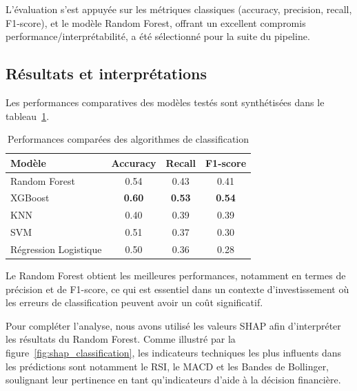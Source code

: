 \documentclass[a4paper,12pt]{article}
\begin{document}
L'évaluation s'est appuyée sur les métriques classiques (accuracy, precision, recall, F1-score), et le modèle Random Forest, offrant un excellent compromis performance/interprétabilité, a été sélectionné pour la suite du pipeline.

\subsection*{Résultats et interprétations}

Les performances comparatives des modèles testés sont synthétisées dans le tableau~\ref{tab:classification_performance}.

\begin{table}[h!]
\centering
\begin{tabular}{|l|c|c|c|}
\hline
\textbf{Modèle} & \textbf{Accuracy} & \textbf{Recall} & \textbf{F1-score}\\
\hline
Random Forest & 0.54 & 0.43 & 0.41\\
XGBoost & \textbf{0.60} & \textbf{0.53}  & \textbf{0.54}\\
KNN & 0.40 & 0.39  & 0.39\\
SVM & 0.51 & 0.37  & 0.30\\
Régression Logistique &  0.50 & 0.36 & 0.28\\
\hline
\end{tabular}
\caption{Performances comparées des algorithmes de classification}
\label{tab:classification_performance}
\end{table}

Le Random Forest obtient les meilleures performances, notamment en termes de précision et de F1-score, ce qui est essentiel dans un contexte d’investissement où les erreurs de classification peuvent avoir un coût significatif.

Pour compléter l’analyse, nous avons utilisé les valeurs SHAP afin d’interpréter les résultats du Random Forest. Comme illustré par la figure~\ref{fig:shap_classification}, les indicateurs techniques les plus influents dans les prédictions sont notamment le RSI, le MACD et les Bandes de Bollinger, soulignant leur pertinence en tant qu'indicateurs d'aide à la décision financière.
\end{document}
